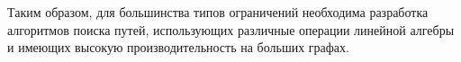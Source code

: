 Таким образом, для большинства типов ограничений необходима разработка алгоритмов поиска путей, использующих различные операции линейной алгебры и имеющих высокую производительность на больших графах.





